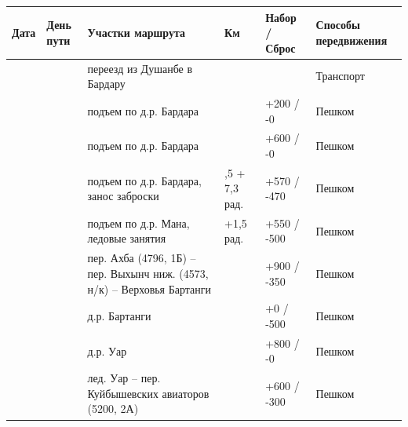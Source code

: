 \documentclass[a5paper, 12pt, twoside]{article}
\begin{document}
        \renewcommand{\arraystretch}{1.2}
        {\scriptsize%
        \begin{longtable}{%
            |>{\centering\arraybackslash} m{1cm}%
            |>{\centering\arraybackslash} m{0.8cm}%
            |>{\centering\arraybackslash} m{6cm}%
            |>{\centering\arraybackslash} m{1.1cm}%
            |>{\centering\arraybackslash} m{2cm}%
            |>{\centering\arraybackslash} m{2.1cm}|}
            \hline\rowcolor{Gray}
            Дата & День пути    & Участки маршрута                                                                  & Км                &   Набор / Сброс   & Способы передвижения\\ \hline
            24.7 & 0            & переезд из Душанбе в Бардару                                                      &                   &                   & Транспорт\\ \hline
            25.7 & 1            & подъем по д.р. Бардара                                                            & 4                 &   +200 / -0       & Пешком\\ \hline
            26.7 & 2            & подъем по д.р. Бардара                                                            & 12.5              &   +600 / -0       & Пешком\\ \hline
            27.7 & 3            & подъем по д.р. Бардара, занос заброски                                            & 3,5 + 7,3 рад.    &   +570 / -470     & Пешком\\ \hline
            28.7 & 4            & подъем по д.р. Мана, ледовые занятия                                              & 3+1,5 рад.        &   +550 / -500     & Пешком\\ \hline
            29.7 & 5            & пер. Ахба (4796, 1Б) -- пер. Выхынч ниж. (4573, н/к) -- Верховья Бартанги         & 15                &   +900 / -350     & Пешком\\ \hline
            30.7 & 6            & д.р. Бартанги                                                                     & 7                 &   +0 / -500       & Пешком\\ \hline
            31.7 & 7            & д.р. Уар                                                                          & 10                &   +800 / -0       & Пешком\\ \hline
            1.8  & 8            & лед. Уар -- пер. Куйбышевских авиаторов (5200, 2А)                                & 10                &   +600 / -300     & Пешком\\ \hline

\end{longtable}}
\end{document}
